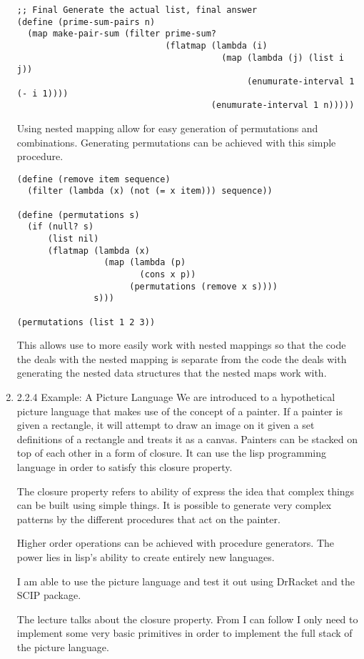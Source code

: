\documentclass[11pt]{article}
\begin{document}
\begin{enumerate}
\begin{verbatim}
;; Final Generate the actual list, final answer
(define (prime-sum-pairs n)
  (map make-pair-sum (filter prime-sum?
                             (flatmap (lambda (i)
                                        (map (lambda (j) (list i j))
                                             (enumurate-interval 1 (- i 1))))
                                      (enumurate-interval 1 n)))))
\end{verbatim}

Using nested mapping allow for easy generation of permutations and
combinations. Generating permutations can be achieved with this simple
procedure.

\begin{verbatim}
(define (remove item sequence)
  (filter (lambda (x) (not (= x item))) sequence))

(define (permutations s)
  (if (null? s)
      (list nil)
      (flatmap (lambda (x)
                 (map (lambda (p)
                        (cons x p))
                      (permutations (remove x s))))
               s)))

(permutations (list 1 2 3))
\end{verbatim}

This allows use to more easily work with nested mappings so that the
code the deals with the nested mapping is separate from the code the
deals with generating the nested data structures that the nested maps
work with.

\item 2.2.4 Example: A Picture Language
\label{sec:orgcf66ea6}
We are introduced to a hypothetical picture language that makes use of
the concept of a painter. If a painter is given a rectangle, it will
attempt to draw an image on it given a set definitions of a rectangle
and treats it as a canvas. Painters can be stacked on top of each other
in a form of closure. It can use the lisp programming language in order
to satisfy this closure property.

The closure property refers to ability of express the idea that complex
things can be built using simple things. It is possible to generate very
complex patterns by the different procedures that act on the painter.

Higher order operations can be achieved with procedure generators. The
power lies in lisp's ability to create entirely new languages.

I am able to use the picture language and test it out using DrRacket and
the SCIP package.

The lecture talks about the closure property. From I can follow I only
need to implement some very basic primitives in order to implement the
full stack of the picture language.


\end{enumerate}
\end{document}

